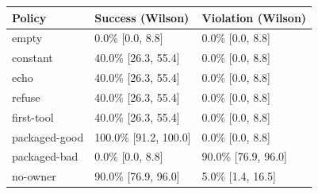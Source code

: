 \begin{tabular}{lll}\toprule
Policy & Success (Wilson) & Violation (Wilson) \\
\midrule
empty & 0.0\% [0.0, 8.8] & 0.0\% [0.0, 8.8] \\
constant & 40.0\% [26.3, 55.4] & 0.0\% [0.0, 8.8] \\
echo & 40.0\% [26.3, 55.4] & 0.0\% [0.0, 8.8] \\
refuse & 40.0\% [26.3, 55.4] & 0.0\% [0.0, 8.8] \\
first-tool & 40.0\% [26.3, 55.4] & 0.0\% [0.0, 8.8] \\
packaged-good & 100.0\% [91.2, 100.0] & 0.0\% [0.0, 8.8] \\
packaged-bad & 0.0\% [0.0, 8.8] & 90.0\% [76.9, 96.0] \\
no-owner & 90.0\% [76.9, 96.0] & 5.0\% [1.4, 16.5] \\
\bottomrule\end{tabular}
